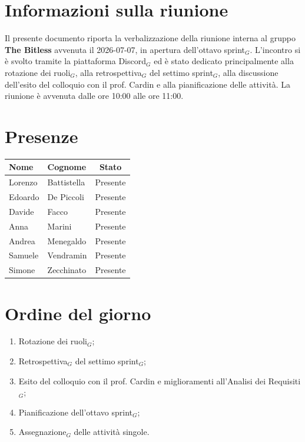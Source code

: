 \documentclass[a4paper, 10pt, colorlinks=true, linkcolor=black, urlcolor=blue, citecolor=blue, hidelinks]{article}
\begin{document}
\newcommand{\titolo}{Verbale interno}
\newcommand{\dataverbale}{2026-07-07}
\newcommand{\dataversione}{2026-07-07}
\newcommand{\versione}{1.0.0}
\newcommand{\stato}{Approvato}
\newcommand{\destinatari}{The Bitless, prof. Tullio Vardanega, prof. Riccardo Cardin}
\def\templatedir{../../../../templates}

\begin{titlepage}

\end{titlepage}

\newpage
\tableofcontents

\newpage
{}
\section{Informazioni sulla riunione}
Il presente documento riporta la verbalizzazione della riunione interna al gruppo \textbf{The Bitless} avvenuta il \dataverbale{}, in apertura dell'ottavo sprint$_G$. L'incontro si è svolto tramite la piattaforma Discord$_G$ ed è stato dedicato principalmente alla rotazione dei ruoli$_G$, alla retrospettiva$_G$ del settimo sprint$_G$, alla discussione dell'esito del colloquio con il prof. Cardin e alla pianificazione delle attività. La riunione è avvenuta dalle ore 10:00 alle ore 11:00. \\

\section{Presenze}
\begin{center}
\begin{tabular}{|l|l|c|}
\hline
\textbf{Nome} & \textbf{Cognome} & \textbf{Stato} \\
\hline
Lorenzo & Battistella & Presente \\
Edoardo & De Piccoli & Presente \\
Davide & Facco & Presente \\
Anna & Marini & Presente \\
Andrea & Menegaldo & Presente \\
Samuele & Vendramin & Presente \\
Simone & Zecchinato & Presente \\
\hline
\end{tabular}
\end{center}

\section{Ordine del giorno}
\begin{enumerate}
    \item Rotazione dei ruoli$_G$;
    \item Retrospettiva$_G$ del settimo sprint$_G$;
    \item Esito del colloquio con il prof. Cardin e miglioramenti all'Analisi dei Requisiti$_G$;
    \item Pianificazione dell'ottavo sprint$_G$;
    \item Assegnazione$_G$ delle attività singole.
\end{enumerate}
\end{document}
